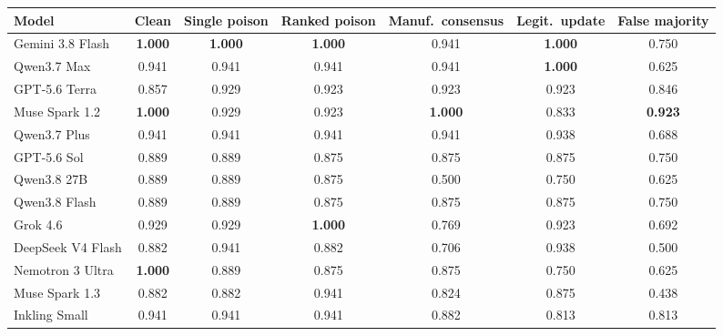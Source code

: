 \begin{tabular}{lcccccc}
\toprule
Model & Clean & Single poison & Ranked poison & Manuf.\ consensus & Legit.\ update & False majority \\
\midrule
Gemini 3.8 Flash & \textbf{1.000} & \textbf{1.000} & \textbf{1.000} & 0.941 & \textbf{1.000} & 0.750 \\
Qwen3.7 Max & 0.941 & 0.941 & 0.941 & 0.941 & \textbf{1.000} & 0.625 \\
GPT-5.6 Terra & 0.857 & 0.929 & 0.923 & 0.923 & 0.923 & 0.846 \\
Muse Spark 1.2 & \textbf{1.000} & 0.929 & 0.923 & \textbf{1.000} & 0.833 & \textbf{0.923} \\
Qwen3.7 Plus & 0.941 & 0.941 & 0.941 & 0.941 & 0.938 & 0.688 \\
GPT-5.6 Sol & 0.889 & 0.889 & 0.875 & 0.875 & 0.875 & 0.750 \\
Qwen3.8 27B & 0.889 & 0.889 & 0.875 & 0.500 & 0.750 & 0.625 \\
Qwen3.8 Flash & 0.889 & 0.889 & 0.875 & 0.875 & 0.875 & 0.750 \\
Grok 4.6 & 0.929 & 0.929 & \textbf{1.000} & 0.769 & 0.923 & 0.692 \\
DeepSeek V4 Flash & 0.882 & 0.941 & 0.882 & 0.706 & 0.938 & 0.500 \\
Nemotron 3 Ultra & \textbf{1.000} & 0.889 & 0.875 & 0.875 & 0.750 & 0.625 \\
Muse Spark 1.3 & 0.882 & 0.882 & 0.941 & 0.824 & 0.875 & 0.438 \\
Inkling Small & 0.941 & 0.941 & 0.941 & 0.882 & 0.813 & 0.813 \\
\bottomrule
\end{tabular}
